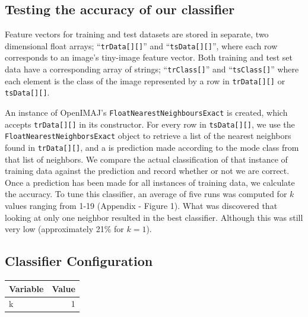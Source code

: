 \documentclass[a4paper]{article}
\begin{document}
\subsection{Testing the accuracy of our classifier}

Feature vectors for training and test datasets are stored in separate, two dimensional float arrays; ``\texttt{trData[][]}'' and ``\texttt{tsData[][]}'', where each row corresponds to an image’s tiny-image feature vector. Both training and test set data have a corresponding array of strings; ``\texttt{trClass[]}'' and ``\texttt{tsClass[]}'' where each element is the class of the image represented by a row in \texttt{trData[][]} or \texttt{tsData[][]}.

An instance of OpenIMAJ’s \texttt{FloatNearestNeighboursExact} is created, which accepts \texttt{trData[][]} in its constructor. For every row in \texttt{tsData[][]}, we use the \texttt{FloatNearestNeighborsExact} object to retrieve a list of the nearest neighbors found in \texttt{trData[][]}, and a is prediction made according to the mode class from that list of neighbors. We compare the actual classification of that instance of training data against the prediction and record whether or not we are correct. Once a prediction has been made for all instances of training data, we calculate the accuracy. To tune this classifier, an average of five runs was computed for $k$ values ranging from 1-19 (Appendix - Figure 1). What was discovered that looking at only one neighbor resulted in the best classifier. Although this was still very low (approximately 21\% for $k=1$).

\subsection{Classifier Configuration}

\begin{center}
    \def\arraystretch{1.5}%
    \begin{tabular}{ | l | r |}
    \hline
    \textbf{Variable} & \textbf{Value} \\ \hline
    k & 1 \\ \hline
    \end{tabular}
\end{center}
\bigskip

\end{document}
